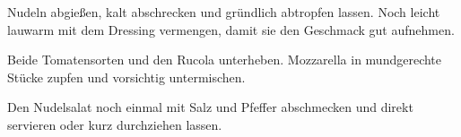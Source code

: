 \begin{recipe}
{    \step%
    Nudeln abgießen, kalt abschrecken und gründlich abtropfen lassen. Noch leicht lauwarm mit dem Dressing vermengen, damit sie den Geschmack gut aufnehmen.

    \step%
    Beide Tomatensorten und den Rucola unterheben. Mozzarella in mundgerechte Stücke zupfen und vorsichtig untermischen.

    \step%
    Den Nudelsalat noch einmal mit Salz und Pfeffer abschmecken und direkt servieren oder kurz durchziehen lassen.
}



\end{recipe}
